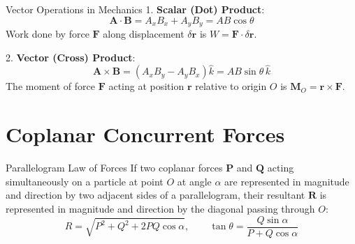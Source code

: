 \begin{theorembox}{Vector Operations in Mechanics}
1. \textbf{Scalar (Dot) Product}:
\begin{equation}
\mathbf{A} \cdot \mathbf{B} = A_x B_x + A_y B_y = A B \cos\theta
\end{equation}
Work done by force $\mathbf{F}$ along displacement $\delta\mathbf{r}$ is $W = \mathbf{F} \cdot \delta\mathbf{r}$.

2. \textbf{Vector (Cross) Product}:
\begin{equation}
\mathbf{A} \times \mathbf{B} = (A_x B_y - A_y B_x) \hat{k} = A B \sin\theta \, \hat{k}
\end{equation}
The moment of force $\mathbf{F}$ acting at position $\mathbf{r}$ relative to origin $O$ is $\mathbf{M}_O = \mathbf{r} \times \mathbf{F}$.
\end{theorembox}

\section{Coplanar Concurrent Forces}

\begin{theorembox}{Parallelogram Law of Forces}
If two coplanar forces $\mathbf{P}$ and $\mathbf{Q}$ acting simultaneously on a particle at point $O$ at angle $\alpha$ are represented in magnitude and direction by two adjacent sides of a parallelogram, their resultant $\mathbf{R}$ is represented in magnitude and direction by the diagonal passing through $O$:
\begin{equation}
R = \sqrt{P^2 + Q^2 + 2PQ\cos\alpha}, \qquad \tan\theta = \frac{Q\sin\alpha}{P + Q\cos\alpha}
\end{equation}
\end{theorembox}

